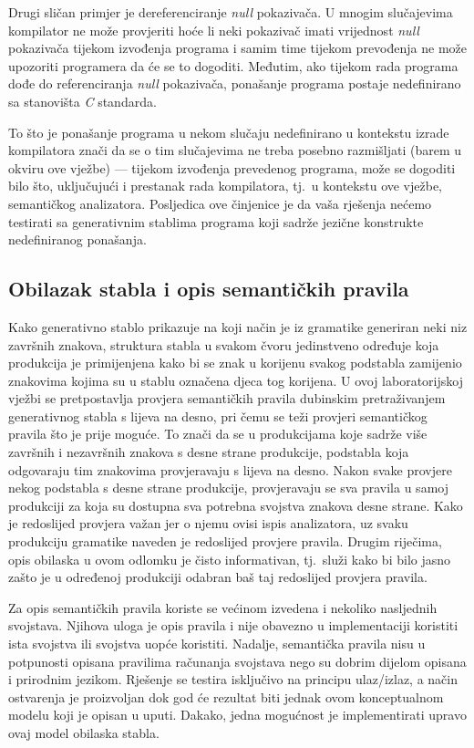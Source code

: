 \documentclass[times, 12pt, utf8]{book}
\begin{document}
Drugi sličan primjer je dereferenciranje \emph{null} pokazivača.
U mnogim slučajevima kompilator ne može provjeriti hoće li neki pokazivač imati vrijednost \emph{null} pokazivača tijekom izvođenja programa i samim time tijekom prevođenja ne može upozoriti programera da će se to dogoditi.
Međutim, ako tijekom rada programa dođe do referenciranja \emph{null} pokazivača, ponašanje programa postaje nedefinirano sa stanovišta \emph{C} standarda.

To što je ponašanje programa u nekom slučaju nedefinirano u kontekstu izrade kompilatora znači da se o tim slučajevima ne treba posebno razmišljati (barem u okviru ove vježbe) --- tijekom izvođenja prevedenog programa, može se dogoditi bilo što, uključujući i prestanak rada kompilatora, tj.~u kontekstu ove vježbe, semantičkog analizatora.
Posljedica ove činjenice je da vaša rješenja nećemo testirati sa generativnim stablima programa koji sadrže jezične konstrukte nedefiniranog ponašanja.

\subsection{Obilazak stabla i opis semantičkih pravila}\label{sec:obilazak}
Kako generativno stablo prikazuje na koji način je iz gramatike generiran neki niz završnih znakova, struktura stabla u svakom čvoru jedinstveno određuje koja produkcija je primijenjena kako bi se znak u korijenu svakog podstabla zamijenio znakovima kojima su u stablu označena djeca tog korijena.
U ovoj laboratorijskoj vježbi se pretpostavlja provjera semantičkih pravila dubinskim pretraživanjem generativnog stabla s lijeva na desno, pri čemu se teži provjeri semantičkog pravila što je prije moguće.
To znači da se u produkcijama koje sadrže više završnih i nezavršnih znakova s desne strane produkcije, podstabla koja odgovaraju tim znakovima provjeravaju s lijeva na desno.
Nakon svake provjere nekog podstabla s desne strane produkcije, provjeravaju se sva pravila u samoj produkciji za koja su dostupna sva potrebna svojstva znakova desne strane.
Kako je redoslijed provjera važan jer o njemu ovisi ispis analizatora, uz svaku produkciju gramatike naveden je redoslijed provjere pravila.
Drugim riječima, opis obilaska u ovom odlomku je čisto informativan, tj.~služi kako bi bilo jasno zašto je u određenoj produkciji odabran baš taj redoslijed provjera pravila.

Za opis semantičkih pravila koriste se većinom izvedena i nekoliko nasljednih svojstava.
Njihova uloga je opis pravila i nije obavezno u implementaciji koristiti ista svojstva ili svojstva uopće koristiti.
Nadalje, semantička pravila nisu u potpunosti opisana pravilima računanja svojstava nego su dobrim dijelom opisana i prirodnim jezikom.
Rješenje se testira isključivo na principu ulaz\slash{}izlaz, a način ostvarenja je proizvoljan dok god će rezultat biti jednak ovom konceptualnom modelu koji je opisan u uputi.
Dakako, jedna mogućnost je implementirati upravo ovaj model obilaska stabla.
\end{document}
